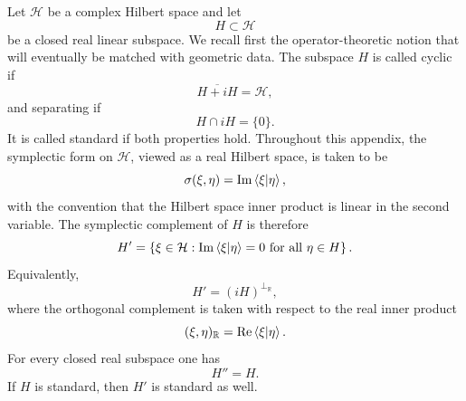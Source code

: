 \documentclass[a4paper,11pt]{article}
\theoremstyle{definition}
\newcommand{\cH}{\mathcal{H}}
\begin{document}
Let $\cH$ be a complex Hilbert space and let
\begin{equation}
    H\subset \cH
\end{equation}
be a closed real linear subspace.  We recall first the operator-theoretic
notion that will eventually be matched with geometric data.  The subspace
$H$ is called cyclic if
\begin{equation}
    \overline{H+iH}=\cH,
\end{equation}
and separating if
\begin{equation}
    H\cap iH=\{0\}.
\end{equation}
It is called standard if both properties hold.  Throughout this appendix, the
symplectic form on $\cH$, viewed as a real Hilbert space, is taken to be
\begin{equation}
    \sigma(\xi,\eta)
    =
    \operatorname{Im}\braket{\xi|\eta},
\end{equation}
with the convention that the Hilbert space inner product is linear in the
second variable.  The symplectic complement of $H$ is therefore
\begin{equation}
    H'
    =
    \left\{
    \xi\in\cH:
    \operatorname{Im}\braket{\xi|\eta}=0
    \text{ for all }\eta\in H
    \right\}.
\end{equation}
Equivalently,
\begin{equation}
    H'=(iH)^{\perp_{\mathbb R}},
\end{equation}
where the orthogonal complement is taken with respect to the real inner
product
\begin{equation}
    (\xi,\eta)_{\mathbb R}
    =
    \operatorname{Re}\braket{\xi|\eta}.
\end{equation}
For every closed real subspace one has
\begin{equation}
    H''=H.
\end{equation}
If $H$ is standard, then $H'$ is standard as well.
\end{document}
